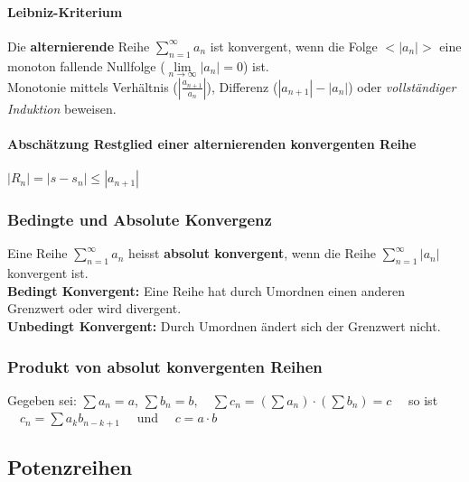 \paragraph{Leibniz-Kriterium}
Die \textbf{alternierende} Reihe $ \sum\limits_{n=1}^{\infty} a_n $ ist konvergent, wenn die Folge $<\left|a_n\right|>$ eine monoton fallende Nullfolge ($\lim\limits_{n \to \infty}
\left|a_n\right| = 0 $) ist.
\\ Monotonie mittels Verhältnis ($ \left|\frac{a_{n+1}}{a_n}\right| $), Differenz ($ |a_{n+1}| - |a_n| $) oder \textit{vollständiger Induktion} beweisen.\\ 

\paragraph{Abschätzung Restglied einer alternierenden konvergenten
Reihe}\qquad $|R_n| = |s-s_n|\leq |a_{n+1}|$


\subsubsection{Bedingte und Absolute Konvergenz}
Eine Reihe $\sum\limits_{n=1}^{\infty}a_n$ heisst \textbf{absolut konvergent}, wenn die
Reihe $\sum\limits_{n=1}^{\infty}|a_n|$ konvergent ist.\\
\textbf{Bedingt Konvergent:} Eine Reihe hat durch Umordnen einen anderen
Grenzwert oder wird divergent.\\
\textbf{Unbedingt Konvergent:} Durch Umordnen ändert sich der Grenzwert nicht.

\subsubsection{Produkt von absolut konvergenten Reihen} 
Gegeben sei: $\sum a_n=a$, \quad $\sum b_n=b, \quad \sum c_n = (\sum a_n) \cdot (\sum b_n) = c \quad $ so ist
$ \quad c_n=\sum a_kb_{n-k+1} \quad $ und $ \quad c = a \cdot b $



\subsection{Potenzreihen}



